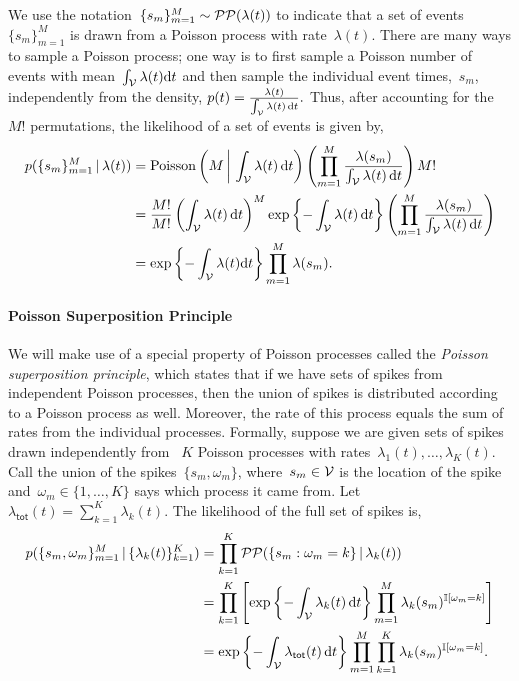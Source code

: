 We use the notation~${\{s_m\}_{m=1}^M\sim\mathcal{PP}(\lambda(t))}$ to indicate
that a set of events~$\{s_m\}_{m=1}^M$ is drawn from a Poisson process
with rate~$\lambda(t)$. There are many ways to sample a Poisson
process; one way is to first sample a Poisson number of events with
mean~${\int_{\mathcal{V}} \lambda(t) \mathrm{d}t}$ and then sample the individual
event times,~$s_m$, independently from the density,
${
  p(t) = \frac{\lambda(t)}{\int_{\mathcal{V}} \lambda(t) \, \mathrm{d}t}.
}$
Thus, after accounting for the~$M!$ permutations,
the likelihood of a set of events is given by,
\begin{align}
  \nonumber
  p(\{s_m\}_{m=1}^M \,|\, \lambda(t))
  &= \mathrm{Poisson} \left(M \, \bigg| \, \int_{\mathcal{V}} \lambda(t) \, \mathrm{d} t \right)
  \left( \prod_{m=1}^M \frac{\lambda(s_m)}{\int_{\mathcal{V}} \lambda(t) \, \mathrm{d}t} \right)  M! \\
  \nonumber
  &= \frac{M!}{M!} \left(\int_{\mathcal{V}} \lambda(t) \, \mathrm{d} t \right)^M
  \exp \left \{-\int_{\mathcal{V}} \lambda(t) \, \mathrm{d} t \right \} 
  \left( \prod_{m=1}^M \frac{\lambda(s_m)}{\int_{\mathcal{V}} \lambda(t) \, \mathrm{d}t} \right) \\
  \label{eq:poisson_lkhd}
  &=\exp\left\{-\int_{\mathcal{V}}\lambda(t)\mathrm{d}t \right\}
  \prod_{m=1}^M\lambda(s_m).
\end{align}

\paragraph{Poisson Superposition Principle}
We will make use of a special property of Poisson processes called the
\emph{Poisson superposition principle}, which states that if we have 
sets of spikes from independent Poisson processes, then the union of spikes 
is distributed according to a Poisson process as well.
Moreover, the rate of this process equals the sum of 
rates from the individual processes. 
Formally, suppose we are given sets of spikes drawn independently
from ~$K$ Poisson processes with rates~${\lambda_1(t), \ldots,
  \lambda_K(t)}$.  Call the union of the spikes~${\{s_m,
  \omega_m\}}$, where~${s_m \in \mathcal{V}}$ is the location of the spike
and~${\omega_m \in \{1, \ldots, K\}}$ says which process it came
from. Let~${\lambda_{\mathsf{tot}}(t) = \sum_{k=1}^K \lambda_k(t)}$.
The likelihood of the full set of spikes is,
\begin{align*}
  p(\{s_m, \omega_m\}_{m=1}^M \,|\, \{\lambda_k(t)\}_{k=1}^K)
  &= \prod_{k=1}^K \mathcal{PP}(\{s_m: \omega_m=k\} \,|\, \lambda_k(t)) \\
  &= \prod_{k=1}^K \left[
    \exp\left\{-\int_{\mathcal{V}} \lambda_k(t) \, \mathrm{d}t\right\}
    \prod_{m=1}^M \lambda_k(s_m)^{\mathbb{I}[\omega_m = k]} \right] \\
  &= \exp\left\{-\int_{\mathcal{V}} \lambda_{\mathsf{tot}}(t) \, \mathrm{d}t\right\}
  \prod_{m=1}^M \prod_{k=1}^K \lambda_k(s_m)^{\mathbb{I}[\omega_m = k]}.
\end{align*}

